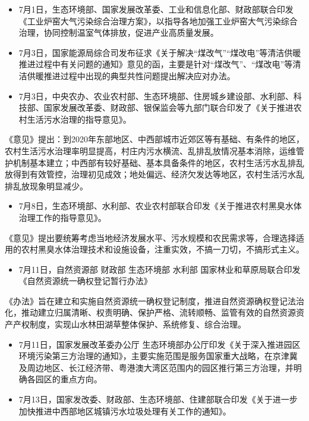 \documentclass[
]{book}
\providecommand{\tightlist}{%
  \setlength{\itemsep}{0pt}\setlength{\parskip}{0pt}}
\begin{document}
\begin{itemize}
\item
  7月1日，生态环境部、国家发展改革委、工业和信息化部、财政部联合印发《工业炉窑大气污染综合治理方案》，以指导各地加强工业炉窑大气污染综合治理，协同控制温室气体排放，促进产业高质量发展。
\item
  7月3日，国家能源局综合司发布征求《关于解决``煤改气''``煤改电''等清洁供暖推进过程中有关问题的通知》意见的函，主要是针对``煤改气''、``煤改电''等清洁供暖推进过程中出现的典型共性问题提出解决应对办法。
\item
  7月3日，中央农办、农业农村部、生态环境部、住房城乡建设部、水利部、科技部、国家发展改革委、财政部、银保监会等九部门联合印发了《关于推进农村生活污水治理的指导意见》。
\end{itemize}

《意见》提出：到2020年东部地区、中西部城市近郊区等有基础、有条件的地区，农村生活污水治理率明显提高，村庄内污水横流、乱排乱放情况基本消除，运维管护机制基本建立；中西部有较好基础、基本具备条件的地区，农村生活污水乱排乱放得到有效管控，治理初见成效；地处偏远、经济欠发达等地区，农村生活污水乱排乱放现象明显减少。

\begin{itemize}
\tightlist
\item
  7月8日，生态环境部、水利部、农业农村部联合印发《关于推进农村黑臭水体治理工作的指导意见》。
\end{itemize}

《意见》提出要统筹考虑当地经济发展水平、污水规模和农民需求等，合理选择适用的农村黑臭水体治理技术和设施设备，注重实效，不搞一刀切，不搞形式主义。

\begin{itemize}
\tightlist
\item
  7月11日，自然资源部 财政部 生态环境部 水利部 国家林业和草原局联合印发《自然资源统一确权登记暂行办法》
\end{itemize}

《办法》旨在建立和实施自然资源统一确权登记制度，推进自然资源确权登记法治化，推动建立归属清晰、权责明确、保护严格、流转顺畅、监管有效的自然资源资产产权制度，实现山水林田湖草整体保护、系统修复、综合治理。

\begin{itemize}
\item
  7月11日，国家发展改革委办公厅 生态环境部办公厅印发《关于深入推进园区环境污染第三方治理的通知》，主要实施范围是服务国家重大战略，在京津冀及周边地区、长江经济带、粤港澳大湾区范围内的园区推行第三方治理，并明确各园区的重点方向。
\item
  7月13日，国家发改委、财政部、生态环境部、住建部联合印发《关于进一步加快推进中西部地区城镇污水垃圾处理有关工作的通知》。
\end{itemize}
\end{document}
